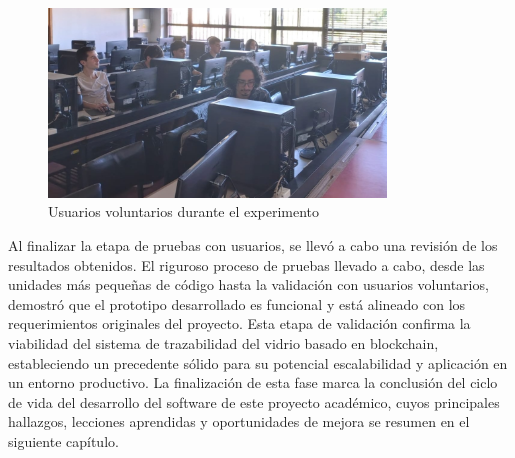 \begin{figure}[!htb]
\centering
\includegraphics[width=0.8\textwidth]{Figures/uat-2.jpg}
\caption{Usuarios voluntarios durante el experimento}
\label{fig:uat-picture-2}
\end{figure}

Al finalizar la etapa de pruebas con usuarios, se llevó a cabo una revisión de los resultados obtenidos. El riguroso proceso de pruebas llevado a cabo, desde las unidades más pequeñas de código hasta la validación con usuarios voluntarios, demostró que el prototipo desarrollado es funcional y está alineado con los requerimientos originales del proyecto. Esta etapa de validación confirma la viabilidad del sistema de trazabilidad del vidrio basado en blockchain, estableciendo un precedente sólido para su potencial escalabilidad y aplicación en un entorno productivo. La finalización de esta fase marca la conclusión del ciclo de vida del desarrollo del software de este proyecto académico, cuyos principales hallazgos, lecciones aprendidas y oportunidades de mejora se resumen en el siguiente capítulo.
